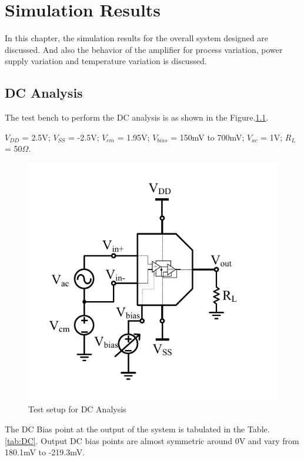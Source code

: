 \chapter{Simulation Results}

In this chapter, the simulation results for the overall system designed are discussed. And also the behavior of the amplifier for process variation, power supply variation and  temperature variation is discussed. 

\section{DC Analysis}
The test bench to perform the DC analysis is as shown in the Figure.\ref{fig:TB_ACDC}. 

$V_{DD}$ = 2.5V; $V_{SS}$ = -2.5V; $V_{cm}$ = 1.95V; $V_{bias}$ = 150mV to 700mV;  $V_{ac}$ = 1V; $R_{L}$ = 50$\Omega$.
\begin{figure} [H]
\centering
\includegraphics[scale=1]{Figures/Test_Benches/Overall/ACDC.pdf}
\caption{Test setup for DC Analysis}
\label{fig:TB_ACDC}
\end{figure}
The DC Bias point at the output of the system is tabulated in the Table.\ref{tab:DC}. Output DC bias points are almost symmetric around 0V and vary from 180.1mV to -219.3mV.
